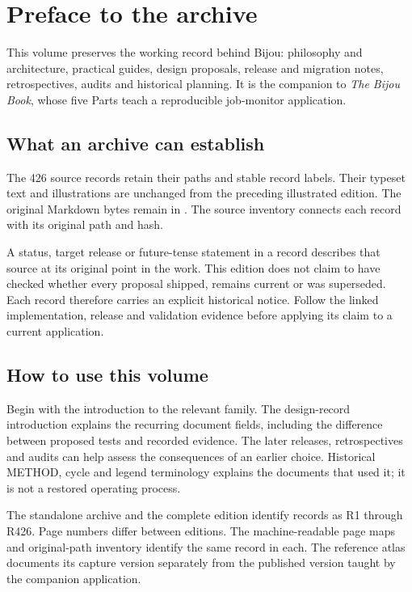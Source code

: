 \chapter*{Preface to the archive}\label{preface}

This volume preserves the working record behind Bijou: philosophy and architecture, practical guides, design proposals, release and migration notes, retrospectives, audits and historical planning. It is the companion to \textit{The Bijou Book}, whose five Parts teach a reproducible job-monitor application.

\section*{What an archive can establish}

The 426 source records retain their paths and stable record labels. Their typeset text and illustrations are unchanged from the preceding illustrated edition. The original Markdown bytes remain in . The source inventory connects each record with its original path and hash.

A status, target release or future-tense statement in a record describes that source at its original point in the work. This edition does not claim to have checked whether every proposal shipped, remains current or was superseded. Each record therefore carries an explicit historical notice. Follow the linked implementation, release and validation evidence before applying its claim to a current application.

\section*{How to use this volume}

Begin with the introduction to the relevant family. The design-record introduction explains the recurring document fields, including the difference between proposed tests and recorded evidence. The later releases, retrospectives and audits can help assess the consequences of an earlier choice. Historical METHOD, cycle and legend terminology explains the documents that used it; it is not a restored operating process.

The standalone archive and the complete edition identify records as R1 through R426. Page numbers differ between editions. The machine-readable page maps and original-path inventory identify the same record in each. The reference atlas documents its capture version separately from the published version taught by the companion application.

